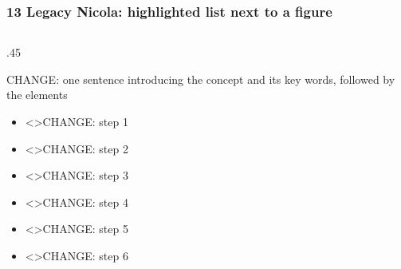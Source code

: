 
\begin{frame}
    \frametitle{13 Legacy Nicola: highlighted list next to a figure}

    \pgfmathsetmacro{}
    \pgfmathsetmacro{}
    \pgfmathsetmacro{}
    \pgfmathsetmacro{}
    \pgfmathsetmacro{}
    \pgfmathsetmacro{}

    \begin{columns}[T]
        \begin{column}{.45\textwidth}

            CHANGE: one sentence introducing the \alert{concept} and its \alert{key words}, followed by the elements

            \vspace{.5em}

            \begin{itemize}\setlength\itemsep{1em}
                \item \alert<\numberProperty>{CHANGE: step 1}
                \item \alert<\numberTarget>{CHANGE: step 2}
                \item \alert<\numberEvidenceCollectionModel>{CHANGE: step 3}
                \item \alert<\numberCertificationModel>{CHANGE: step 4}
                \item \alert<\numberExecution>{CHANGE: step 5}
                \item \alert<\numberCertificate>{CHANGE: step 6}
            \end{itemize}


\end{column}
\end{columns}
\end{frame}
